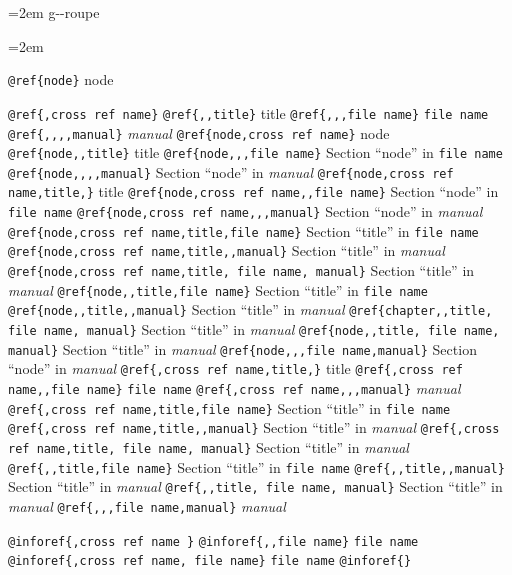 \documentclass{book}
\begin{document}
\endgroup{}%
\par\begingroup\obeylines\obeyspaces\frenchspacing\leftskip=2em\relax\parskip=0pt\relax\ttfamily{}%
g{-}{-}roupe
\endgroup{}%
\par\begingroup\obeylines\obeyspaces\frenchspacing\leftskip=2em\relax\parskip=0pt\relax\ttfamily{}%

\texttt{@ref\{node\}} node

\texttt{@ref\{,cross ref name\}} 
\texttt{@ref\{,,title\}} title
\texttt{@ref\{,,,file name\}} \texttt{file name}
\texttt{@ref\{,,,,manual\}} \textsl{manual}
\texttt{@ref\{node,cross ref name\}} node
\texttt{@ref\{node,,title\}} title
\texttt{@ref\{node,,,file name\}} Section ``node'' in \texttt{file name}
\texttt{@ref\{node,,,,manual\}} Section ``node'' in \textsl{manual}
\texttt{@ref\{node,cross ref name,title,\}} title
\texttt{@ref\{node,cross ref name,,file name\}} Section ``node'' in \texttt{file name}
\texttt{@ref\{node,cross ref name,,,manual\}} Section ``node'' in \textsl{manual}
\texttt{@ref\{node,cross ref name,title,file name\}} Section ``title'' in \texttt{file name}
\texttt{@ref\{node,cross ref name,title,,manual\}} Section ``title'' in \textsl{manual}
\texttt{@ref\{node,cross ref name,title, file name, manual\}} Section ``title'' in \textsl{manual}
\texttt{@ref\{node,,title,file name\}} Section ``title'' in \texttt{file name}
\texttt{@ref\{node,,title,,manual\}} Section ``title'' in \textsl{manual}
\texttt{@ref\{chapter,,title, file name, manual\}} Section ``title'' in \textsl{manual}
\texttt{@ref\{node,,title, file name, manual\}} Section ``title'' in \textsl{manual}
\texttt{@ref\{node,,,file name,manual\}} Section ``node'' in \textsl{manual}
\texttt{@ref\{,cross ref name,title,\}} title
\texttt{@ref\{,cross ref name,,file name\}} \texttt{file name}
\texttt{@ref\{,cross ref name,,,manual\}} \textsl{manual}
\texttt{@ref\{,cross ref name,title,file name\}} Section ``title'' in \texttt{file name}
\texttt{@ref\{,cross ref name,title,,manual\}} Section ``title'' in \textsl{manual}
\texttt{@ref\{,cross ref name,title, file name, manual\}} Section ``title'' in \textsl{manual}
\texttt{@ref\{,,title,file name\}} Section ``title'' in \texttt{file name}
\texttt{@ref\{,,title,,manual\}} Section ``title'' in \textsl{manual}
\texttt{@ref\{,,title, file name, manual\}} Section ``title'' in \textsl{manual}
\texttt{@ref\{,,,file name,manual\}} \textsl{manual}

\texttt{@inforef\{,cross ref name \}} 
\texttt{@inforef\{,,file name\}} \texttt{file name}
\texttt{@inforef\{,cross ref name, file name\}} \texttt{file name}
\texttt{@inforef\{\}} 
\end{document}
